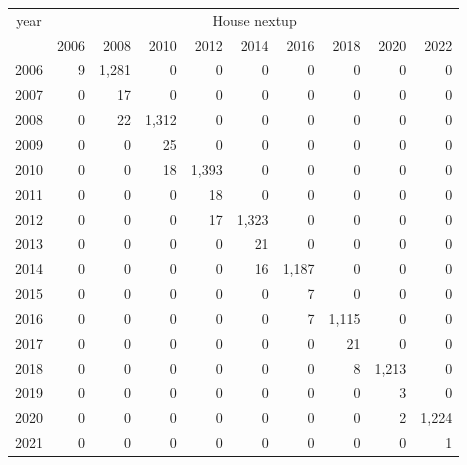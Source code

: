 \footnotesize\begin{tabular}[t]{lrrrrrrrrr}
\toprule
\multicolumn{1}{c}{year} & \multicolumn{9}{c}{House nextup} \\
\cmidrule(l{3pt}r{3pt}){1-1} \cmidrule(l{3pt}r{3pt}){2-10}
  & 2006 & 2008 & 2010 & 2012 & 2014 & 2016 & 2018 & 2020 & 2022\\
\midrule
2006 & 9 & 1,281 & 0 & 0 & 0 & 0 & 0 & 0 & 0\\
2007 & 0 & 17 & 0 & 0 & 0 & 0 & 0 & 0 & 0\\
2008 & 0 & 22 & 1,312 & 0 & 0 & 0 & 0 & 0 & 0\\
2009 & 0 & 0 & 25 & 0 & 0 & 0 & 0 & 0 & 0\\
2010 & 0 & 0 & 18 & 1,393 & 0 & 0 & 0 & 0 & 0\\
2011 & 0 & 0 & 0 & 18 & 0 & 0 & 0 & 0 & 0\\
2012 & 0 & 0 & 0 & 17 & 1,323 & 0 & 0 & 0 & 0\\
2013 & 0 & 0 & 0 & 0 & 21 & 0 & 0 & 0 & 0\\
2014 & 0 & 0 & 0 & 0 & 16 & 1,187 & 0 & 0 & 0\\
2015 & 0 & 0 & 0 & 0 & 0 & 7 & 0 & 0 & 0\\
2016 & 0 & 0 & 0 & 0 & 0 & 7 & 1,115 & 0 & 0\\
2017 & 0 & 0 & 0 & 0 & 0 & 0 & 21 & 0 & 0\\
2018 & 0 & 0 & 0 & 0 & 0 & 0 & 8 & 1,213 & 0\\
2019 & 0 & 0 & 0 & 0 & 0 & 0 & 0 & 3 & 0\\
2020 & 0 & 0 & 0 & 0 & 0 & 0 & 0 & 2 & 1,224\\
2021 & 0 & 0 & 0 & 0 & 0 & 0 & 0 & 0 & 1\\
\bottomrule
\end{tabular}
